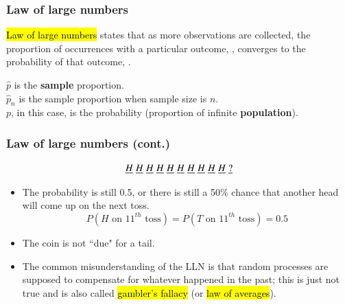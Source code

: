 
\begin{frame}
\frametitle{Law of large numbers}

\hl{Law of large numbers} states that as more observations are collected, the proportion of occurrences with a particular outcome, , converges to the probability of that outcome, .


$\hat{p}$ is the {\bf sample} proportion.\\
$\hat{p}_n$ is the sample proportion when sample size is $n$.\\
$p$, in this case, is the probability (proportion of infinite {\bf population}).

\end{frame}


\begin{frame}
\frametitle{Law of large numbers (cont.)}


\[ \underline{H} \hspace{1mm} \underline{H} \hspace{1mm} \underline{H} \hspace{1mm} \underline{H} \hspace{1mm} \underline{H} \hspace{1mm} \underline{H} \hspace{1mm} \underline{H} \hspace{1mm} \underline{H} \hspace{1mm} \underline{H} \hspace{1mm} \underline{H} \hspace{1mm} \underline{?} \]

\begin{itemize}
\item<2-> The probability is still 0.5, or there is still a 50\% chance that another head will come up on the next toss.
\[ P(H \text{ on 11}^{th} \text{ toss}) = P(T \text{ on 11}^{th} \text{ toss}) = 0.5 \]
\item<3-> The coin is not ``due" for a tail.
\item<4-> The common misunderstanding of the LLN is that random processes are supposed to compensate for whatever happened in the past; this is just not true and is also called \hl{gambler's fallacy} (or \hl{law of averages}).
\end{itemize}

\end{frame}

